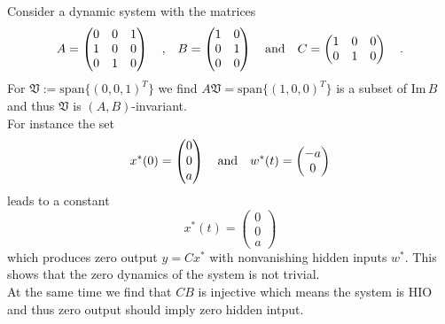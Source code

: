 \begin{example}{}{}
	Consider a dynamic system with the matrices
	\begin{equation}
	A = \begin{pmatrix}
	0 & 0 & 1 \\ 1 & 0 & 0 \\ 0 & 1 & 0
	\end{pmatrix}		 \quad \text{,} \quad
	B = \begin{pmatrix}
	1 & 0 \\ 0 & 1 \\ 0 & 0
	\end{pmatrix}
	\quad \text{and} \quad C =
	\begin{pmatrix}
	1 & 0 & 0 \\ 0 & 1 & 0
	\end{pmatrix} \quad .
	\end{equation}
	For $\mathfrak{V} := \text{span}\{(0,0,1)^T\}$ we find  
	$A\mathfrak{V}=\text{span}\{(1,0,0)^T\}$ is a subset of 
	$\text{Im}\, B$ and thus $\mathfrak{V}$ is $(A,B)$-invariant. \\
	For instance the set
	\begin{equation}
	x^*(0) = \begin{pmatrix}
	0 \\ 0 \\ a
	\end{pmatrix}
	\quad \text{and} \quad
	w^*(t) = \begin{pmatrix}
	- a \\
	0
	\end{pmatrix}
	\end{equation}
	leads to a constant
	\begin{equation}
	x^*(t) = \begin{pmatrix}
	0 \\ 0 \\ a
	\end{pmatrix}
	\end{equation}
	which produces zero output $y=Cx^*$ with nonvanishing hidden inputs 
	$w^*$. This 
	shows that the zero dynamics of the system is not trivial. \\
	At the same time we find that $CB$ is injective which means the 
	system is HIO and thus zero output should imply zero hidden intput.
\end{example}

